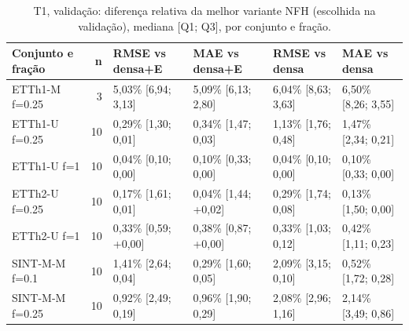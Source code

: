 \begin{table}[htbp]
\centering
\scriptsize
\setlength{\tabcolsep}{2pt}
\caption{T1, valida\c{c}\~ao: diferen\c{c}a relativa da melhor variante NFH (escolhida na valida\c{c}\~ao), mediana [Q1; Q3], por conjunto e fração.}\label{tab:t1_cj_val}
\begin{tabular}{lrllll}
\toprule
\shortstack[l]{Conjunto e\\ fração} & n & \shortstack[l]{RMSE vs\\ densa+E} & \shortstack[l]{MAE vs\\ densa+E} & \shortstack[l]{RMSE vs\\ densa} & \shortstack[l]{MAE vs\\ densa} \\ \midrule
ETTh1-M f=0.25 & 3 & \textminus{}5,03\% [\textminus{}6,94; \textminus{}3,13] & \textminus{}5,09\% [\textminus{}6,13; \textminus{}2,80] & \textminus{}6,04\% [\textminus{}8,63; \textminus{}3,63] & \textminus{}6,50\% [\textminus{}8,26; \textminus{}3,55] \\
ETTh1-U f=0.25 & 10 & \textminus{}0,29\% [\textminus{}1,30; \textminus{}0,01] & \textminus{}0,34\% [\textminus{}1,47; \textminus{}0,03] & \textminus{}1,13\% [\textminus{}1,76; \textminus{}0,48] & \textminus{}1,47\% [\textminus{}2,34; \textminus{}0,21] \\
ETTh1-U f=1 & 10 & \textminus{}0,04\% [\textminus{}0,10; \textminus{}0,00] & \textminus{}0,10\% [\textminus{}0,33; \textminus{}0,00] & \textminus{}0,04\% [\textminus{}0,10; \textminus{}0,00] & \textminus{}0,10\% [\textminus{}0,33; \textminus{}0,00] \\
ETTh2-U f=0.25 & 10 & \textminus{}0,17\% [\textminus{}1,61; \textminus{}0,01] & \textminus{}0,04\% [\textminus{}1,44; +0,02] & \textminus{}0,29\% [\textminus{}1,74; \textminus{}0,08] & \textminus{}0,13\% [\textminus{}1,50; \textminus{}0,00] \\
ETTh2-U f=1 & 10 & \textminus{}0,33\% [\textminus{}0,59; +0,00] & \textminus{}0,38\% [\textminus{}0,87; +0,00] & \textminus{}0,33\% [\textminus{}1,03; \textminus{}0,12] & \textminus{}0,42\% [\textminus{}1,11; \textminus{}0,23] \\
SINT-M-M f=0.1 & 10 & \textminus{}1,41\% [\textminus{}2,64; \textminus{}0,04] & \textminus{}0,29\% [\textminus{}1,60; \textminus{}0,05] & \textminus{}2,09\% [\textminus{}3,15; \textminus{}0,10] & \textminus{}0,52\% [\textminus{}1,72; \textminus{}0,28] \\
SINT-M-M f=0.25 & 10 & \textminus{}0,92\% [\textminus{}2,49; \textminus{}0,19] & \textminus{}0,96\% [\textminus{}1,90; \textminus{}0,29] & \textminus{}2,08\% [\textminus{}2,96; \textminus{}1,16] & \textminus{}2,14\% [\textminus{}3,49; \textminus{}0,86] \\

\end{tabular}
\end{table}
